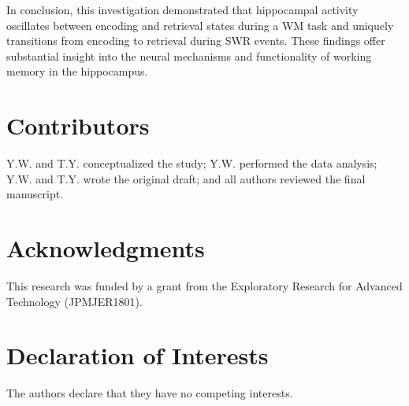 \documentclass[final,3p,times,twocolumn]{elsarticle}
\begin{document}
In conclusion, this investigation demonstrated that hippocampal activity oscillates between encoding and retrieval states during a WM task and uniquely transitions from encoding to retrieval during SWR events. These findings offer substantial insight into the neural mechanisms and functionality of working memory in the hippocampus.
\label{sec:discussion}






% 

% 




\section*{Contributors}
Y.W. and T.Y. conceptualized the study; Y.W. performed the data analysis; Y.W. and T.Y. wrote the original draft; and all authors reviewed the final manuscript.
\label{contributors}

\section*{Acknowledgments}
This research was funded by a grant from the Exploratory Research for Advanced Technology (JPMJER1801).
\label{acknowledgments}

\section*{Declaration of Interests}
The authors declare that they have no competing interests.
\label{declaration of interests}
\end{document}
